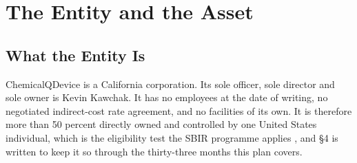 \section{The Entity and the Asset}

\subsection{What the Entity Is}

ChemicalQDevice is a California corporation. Its sole officer, sole director and
sole owner is Kevin Kawchak. It has no employees at the date of writing, no
negotiated indirect-cost rate agreement, and no facilities of its own. It is
therefore more than 50 percent directly owned and controlled by one United
States individual, which is the eligibility test the SBIR programme applies
\cite{ecfr2026sbirownership}, and \S4 is written to keep it so through the
thirty-three months this plan covers.

